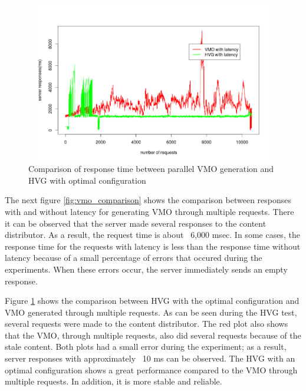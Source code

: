 \begin{figure}[h!]
    \centering
    \includegraphics[width=15cm,height=7cm,keepaspectratio]{images/hvg_vmo_latency_comparison.png}
    \caption{Comparison of response time between parallel VMO generation and HVG with optimal configuration}
    \label{fig:hvg_vmo_latency_comp}
\end{figure}


The next figure \ref{fig:vmo_comparison} shows the comparison between responses with and without latency for generating VMO through multiple requests. There it can be observed that the server made several responses to the content distributor. As a result, the request time is about ~6,000 msec. In some cases, the response time for the requests with latency is less than the response time without latency because of a small percentage of errors that occured during the experiments. When these errors occur, the server immediately sends an empty response.


Figure \ref{fig:hvg_vmo_latency_comp} shows the comparison between HVG with the optimal configuration and VMO generated through multiple requests. As can be seen during the HVG test, several requests were made to the content distributor. The red plot also shows that the VMO, through multiple requests, also did several requests because of the stale content. Both plots had a small error during the experiment; as a result, server responses with approximately ~10 ms can be observed. The HVG with an optimal configuration shows a great performance compared to the VMO through multiple requests. In addition, it is more stable and reliable. 




\newpage

